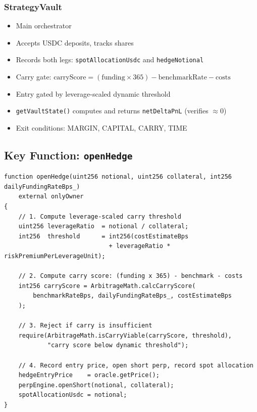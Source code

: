 \documentclass[11pt,a4paper]{article}
\begin{document}
\subsubsection{StrategyVault}
\begin{itemize}
    \item Main orchestrator
    \item Accepts USDC deposits, tracks shares
    \item Records both legs: \texttt{spotAllocationUsdc} and \texttt{hedgeNotional}
    \item Carry gate: $\text{carryScore} = (\text{funding} \times 365) - \text{benchmarkRate} - \text{costs}$
    \item Entry gated by leverage-scaled dynamic threshold
    \item \texttt{getVaultState()} computes and returns \texttt{netDeltaPnL} (verifies $\approx 0$)
    \item Exit conditions: MARGIN, CAPITAL, CARRY, TIME
\end{itemize}

\subsection{Key Function: \texttt{openHedge}}

\begin{lstlisting}[style=solidity, caption={\texttt{StrategyVault.openHedge()} --- carry gate and hedge entry.}]
function openHedge(uint256 notional, uint256 collateral, int256 dailyFundingRateBps_)
    external onlyOwner
{
    // 1. Compute leverage-scaled carry threshold
    uint256 leverageRatio  = notional / collateral;
    int256  threshold      = int256(costEstimateBps
                             + leverageRatio * riskPremiumPerLeverageUnit);

    // 2. Compute carry score: (funding x 365) - benchmark - costs
    int256 carryScore = ArbitrageMath.calcCarryScore(
        benchmarkRateBps, dailyFundingRateBps_, costEstimateBps
    );

    // 3. Reject if carry is insufficient
    require(ArbitrageMath.isCarryViable(carryScore, threshold),
            "carry score below dynamic threshold");

    // 4. Record entry price, open short perp, record spot allocation
    hedgeEntryPrice    = oracle.getPrice();
    perpEngine.openShort(notional, collateral);
    spotAllocationUsdc = notional;
}
\end{lstlisting}
\end{document}
